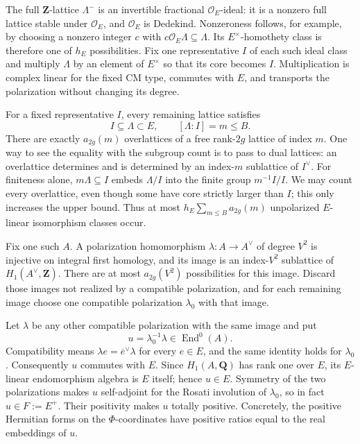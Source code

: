 \documentclass[11pt,a4paper]{article}
\theoremstyle{definition}
\begin{document}
The full \(\mathbf Z\)-lattice \(\Lambda^-\) is an invertible fractional
\(\mathcal O_E\)-ideal: it is a nonzero full lattice stable under
\(\mathcal O_E\), and \(\mathcal O_E\) is Dedekind. Nonzeroness follows,
for example, by choosing a nonzero integer \(c\) with
\(c\mathcal O_E\Lambda\subseteq\Lambda\). Its \(E^\times\)-homothety
class is therefore one of \(h_E\) possibilities. Fix one representative
\(I\) of each such ideal class and multiply \(\Lambda\) by an element of
\(E^\times\) so that its core becomes \(I\). Multiplication is complex
linear for the fixed CM type, commutes with \(E\), and transports the
polarization without changing its degree.

For a fixed representative \(I\), every remaining lattice satisfies \[
 I\subseteq\Lambda\subset E,\qquad [\Lambda:I]=m\le B.
\] There are exactly \(a_{2g}(m)\) overlattices of a free rank-\(2g\)
lattice of index \(m\). One way to see the equality with the subgroup
count is to pass to dual lattices: an overlattice determines and is
determined by an index-\(m\) sublattice of \(I^\vee\). For finiteness
alone, \(m\Lambda\subseteq I\) embeds \(\Lambda/I\) into the finite
group \(m^{-1}I/I\). We may count every overlattice, even though some
have core strictly larger than \(I\); this only increases the upper
bound. Thus at most \(h_E\sum_{m\le B}a_{2g}(m)\) unpolarized
\(E\)-linear isomorphism classes occur.

Fix one such \(A\). A polarization homomorphism \(\lambda:A\to A^\vee\)
of degree \(V^2\) is injective on integral first homology, and its image
is an index-\(V^2\) sublattice of \(H_1(A^\vee,\mathbf Z)\). There are
at most \(a_{2g}(V^2)\) possibilities for this image. Discard those
images not realized by a compatible polarization, and for each remaining
image choose one compatible polarization \(\lambda_0\) with that image.

Let \(\lambda\) be any other compatible polarization with the same image
and put \[
 u=\lambda_0^{-1}\lambda\in\operatorname{End}^0(A).
\] Compatibility means \(\lambda e=\overline e^{\vee}\lambda\) for every
\(e\in E\), and the same identity holds for \(\lambda_0\). Consequently
\(u\) commutes with \(E\). Since \(H_1(A,\mathbf Q)\) has rank one over
\(E\), its \(E\)-linear endomorphism algebra is \(E\) itself; hence
\(u\in E\). Symmetry of the two polarizations makes \(u\) self-adjoint
for the Rosati involution of \(\lambda_0\), so in fact \(u\in F:=E^+\).
Their positivity makes \(u\) totally positive. Concretely, the positive
Hermitian forms on the \(\Phi\)-coordinates have positive ratios equal
to the real embeddings of \(u\).
\end{document}
